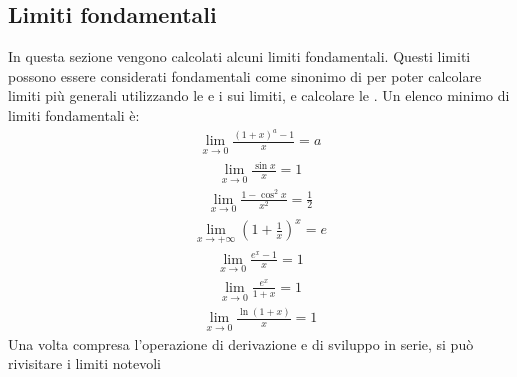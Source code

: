 \documentclass[letterpaper,10pt,english]{jupyterBook}
\begin{document}
\subsection{Limiti fondamentali}
\label{\detokenize{ch/infinitesimal_calculus/analysis:limiti-fondamentali}}\label{\detokenize{ch/infinitesimal_calculus/analysis:infinitesimal-calculus-limits-fund}}
\sphinxAtStartPar
In questa sezione vengono calcolati alcuni limiti fondamentali. Questi limiti possono essere considerati fondamentali come sinonimo di  per poter calcolare limiti più generali utilizzando le {\hyperref[\detokenize{ch/infinitesimal_calculus/analysis:infinitesimal-calculus-limits-thms-operations}]{}} e i {\hyperref[\detokenize{ch/infinitesimal_calculus/analysis:infinitesimal-calculus-limits-thms}]{}} sui limiti, e calcolare le {\hyperref[\detokenize{ch/infinitesimal_calculus/derivatives:infinitesimal-calculus-derivatives-fund}]{}}. Un elenco minimo di limiti fondamentali è:
\begin{equation*}
\begin{split} \lim_{x \rightarrow 0} \frac{(1+x)^a - 1}{x} = a \end{split}
\end{equation*}\begin{equation*}
\begin{split} \lim_{x \rightarrow 0} \frac{\sin x}{x} = 1 \end{split}
\end{equation*}\begin{equation*}
\begin{split} \lim_{x \rightarrow 0} \frac{1 - \cos^2 x}{x^2} = \frac{1}{2} \end{split}
\end{equation*}\begin{equation*}
\begin{split} \lim_{x \rightarrow +\infty} \left( 1 + \frac{1}{x} \right)^x = e \end{split}
\end{equation*}\begin{equation*}
\begin{split} \lim_{x \rightarrow 0} \frac{e^x - 1}{x}= 1 \end{split}
\end{equation*}\begin{equation*}
\begin{split} \lim_{x \rightarrow 0} \frac{e^x}{1+x}= 1 \end{split}
\end{equation*}\begin{equation*}
\begin{split} \lim_{x \rightarrow 0} \frac{\ln (1+x)}{x} = 1 \end{split}
\end{equation*}
\sphinxAtStartPar
Una volta compresa l’operazione di derivazione e di sviluppo in serie, si può rivisitare i limiti notevoli 
\end{document}
